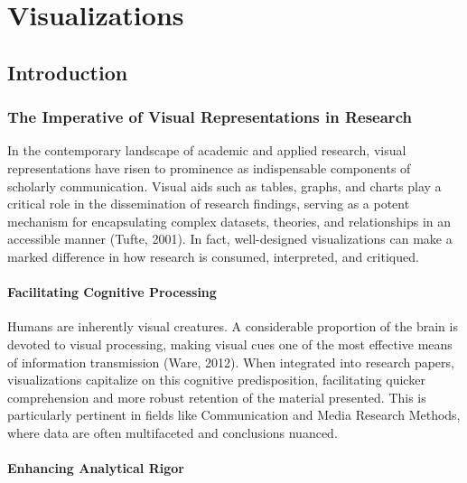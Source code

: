 \documentclass[
  b5paper]{book}
\begin{document}
\hypertarget{visualizations}{%
\chapter{Visualizations}\label{visualizations}}

\hypertarget{introduction-6}{%
\section{Introduction}\label{introduction-6}}

\hypertarget{the-imperative-of-visual-representations-in-research}{%
\subsection{The Imperative of Visual Representations in Research}\label{the-imperative-of-visual-representations-in-research}}

In the contemporary landscape of academic and applied research, visual representations have risen to prominence as indispensable components of scholarly communication. Visual aids such as tables, graphs, and charts play a critical role in the dissemination of research findings, serving as a potent mechanism for encapsulating complex datasets, theories, and relationships in an accessible manner (Tufte, 2001). In fact, well-designed visualizations can make a marked difference in how research is consumed, interpreted, and critiqued.

\hypertarget{facilitating-cognitive-processing}{%
\subsubsection{Facilitating Cognitive Processing}\label{facilitating-cognitive-processing}}

Humans are inherently visual creatures. A considerable proportion of the brain is devoted to visual processing, making visual cues one of the most effective means of information transmission (Ware, 2012). When integrated into research papers, visualizations capitalize on this cognitive predisposition, facilitating quicker comprehension and more robust retention of the material presented. This is particularly pertinent in fields like Communication and Media Research Methods, where data are often multifaceted and conclusions nuanced.

\hypertarget{enhancing-analytical-rigor}{%
\subsubsection{Enhancing Analytical Rigor}\label{enhancing-analytical-rigor}}
\end{document}

